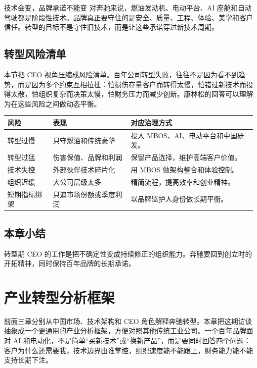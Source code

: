 \documentclass[a4paper]{article}
\begin{document}
\begin{importantbox}{技术会变，品牌承诺不能变}
对奔驰来说，燃油发动机、电动平台、AI 座舱和自动驾驶都是阶段性技术。品牌真正要守住的是安全、质量、工程、体验、美学和客户信任。转型的目标不是守住旧技术，而是让这些承诺穿过新技术周期。
\end{importantbox}

\subsection{转型风险清单}

本节把 CEO 视角压缩成风险清单。百年公司转型失败，往往不是因为看不到趋势，而是因为多个约束互相拉扯：怕损伤存量客户而转得太慢，怕错过新技术而投得太散，怕组织复杂而决策太慢，怕财务压力而减少创新。康林松的回答可以理解为在这些风险之间做动态平衡。

\noindent\begin{tabularx}{\textwidth}{p{}p{}X}
\toprule
风险 & 表现 & 对应治理方式 \\
\midrule
转型过慢 & 只守燃油和传统豪华 & 投入 MBOS、AI、电动平台和中国研发。 \\
转型过猛 & 伤害保值、品牌和利润 & 保留产品选择，维护高端客户价值。 \\
技术失控 & 外部伙伴技术碎片化 & 用 MBOS 做架构整合和体验控制。 \\
组织迟缓 & 大公司层级太多 & 精简流程，提高效率和创业精神。 \\
短期指标绑架 & 只追市场份额或季度利润 & 以品牌监护人身份做长期平衡。 \\
\bottomrule
\end{tabularx}

\subsection{本章小结}

转型期 CEO 的工作是把不确定性变成持续修正的组织能力。奔驰要回到创立时的开拓精神，同时保持百年品牌的长期承诺。

\section{产业转型分析框架}

前面三章分别从中国市场、技术架构和 CEO 角色解释奔驰转型。本章把这期访谈抽象成一个更通用的产业分析框架，方便对照其他传统工业公司。一个百年品牌面对 AI 和电动化，不是简单“买新技术”或“换新产品”，而是要同时回答四个问题：客户为什么还需要我，技术边界由谁掌控，组织速度能不能跟上，财务能力能不能支持长期下注。
\end{document}
